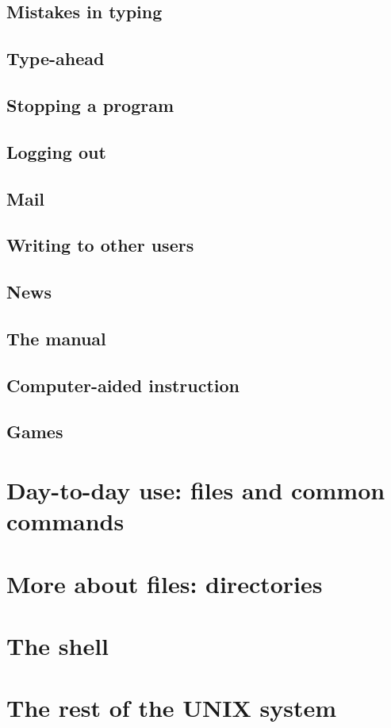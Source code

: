 \subsection{Mistakes in typing}
\subsection{Type-ahead}
\subsection{Stopping a program}
\subsection{Logging out}
\subsection{Mail}
\subsection{Writing to other users}
\subsection{News}
\subsection{The manual}
\subsection{Computer-aided instruction}
\subsection{Games}

\section{Day-to-day use: files and common commands}
\section{More about files: directories}
\section{The shell}
\section{The rest of the UNIX system}
